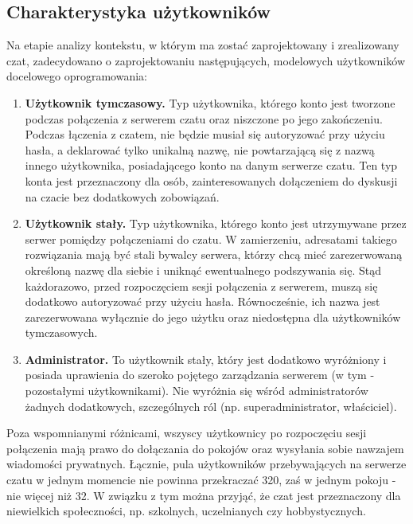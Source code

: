 \subsection{Charakterystyka użytkowników}

Na etapie analizy kontekstu, w którym ma zostać zaprojektowany i zrealizowany czat, zadecydowano o zaprojektowaniu następujących,
modelowych użytkowników docelowego oprogramowania:

\begin{enumerate}

	\item \textbf{Użytkownik tymczasowy.} Typ użytkownika, którego konto jest tworzone podczas połączenia z serwerem czatu oraz 
		niszczone po jego zakończeniu. Podczas łączenia z czatem, nie będzie musiał się autoryzować przy użyciu hasła, a deklarować
		tylko unikalną nazwę, nie powtarzającą się z nazwą innego użytkownika, posiadającego konto na danym serwerze czatu. Ten typ
		konta jest przeznaczony dla osób, zainteresowanych dołączeniem do dyskusji na czacie bez dodatkowych zobowiązań.
		
	\item \textbf{Użytkownik stały.} Typ użytkownika, którego konto jest utrzymywane przez serwer pomiędzy połączeniami do czatu. W
		zamierzeniu, adresatami takiego rozwiązania mają być stali bywalcy serwera, którzy chcą mieć zarezerwowaną określoną nazwę
		dla siebie i uniknąć ewentualnego podszywania się. Stąd każdorazowo, przed rozpoczęciem sesji połączenia z serwerem, muszą się
		dodatkowo autoryzować przy użyciu hasła. Równocześnie, ich nazwa jest zarezerwowana wyłącznie do jego użytku oraz niedostępna
		dla użytkowników tymczasowych.
		
	\item \textbf{Administrator.} To użytkownik stały, który jest dodatkowo wyróżniony i posiada uprawienia do szeroko pojętego 
		zarządzania serwerem (w tym - pozostałymi użytkownikami). Nie wyróżnia się wśród administratorów żadnych dodatkowych, szczególnych
		ról (np. superadministrator, właściciel).
		
\end{enumerate}

Poza wspomnianymi różnicami, wszyscy użytkownicy po rozpoczęciu sesji połączenia mają prawo do dołączania do pokojów oraz wysyłania sobie
nawzajem wiadomości prywatnych. Łącznie, pula użytkowników przebywających na serwerze czatu w jednym momencie nie powinna przekraczać 320,
zaś w jednym pokoju - nie więcej niż 32. W związku z tym można przyjąć, że czat jest przeznaczony dla niewielkich społeczności, np.
szkolnych, uczelnianych czy hobbystycznych.

